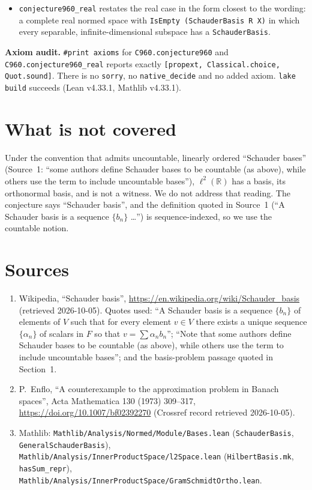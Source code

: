\documentclass[11pt]{article}
\theoremstyle{definition}
\begin{document}
\begin{itemize}
\begin{itemize}
  \texttt{FiniteDimensional K V} implies
  \texttt{Nonempty (UnconditionalSchauderBasis (Fin (Module.finrank K V)) K V)}, and
  \texttt{not (FiniteDimensional K V)} implies \texttt{Nonempty (SchauderBasis K V)};
  \item some \texttt{V : Submodule K X} is closed, separable and not finite-dimensional.
  \end{itemize}
\item \texttt{conjecture960\_real} restates the real case in the form closest to the wording: a
complete real normed space with \texttt{IsEmpty (SchauderBasis R X)} in which every separable,
infinite-dimensional subspace has a \texttt{SchauderBasis}.
\end{itemize}
\textbf{Axiom audit.} \texttt{\#print axioms} for \texttt{C960.conjecture960} and
\texttt{C960.conjecture960\_real} reports exactly \texttt{[propext, Classical.choice,
Quot.sound]}. There is no \texttt{sorry}, no \texttt{native\_decide} and no added axiom.
\texttt{lake build} succeeds (Lean v4.33.1, Mathlib v4.33.1).

\section{What is not covered}
Under the convention that admits uncountable, linearly ordered ``Schauder bases'' (Source~1:
``some authors define Schauder bases to be countable (as above), while others use the term to
include uncountable bases''), $\ell^2(\mathbb{R})$ has a basis, its orthonormal basis, and is not a
witness. We do not address that reading. The conjecture says ``Schauder basis'', and the definition
quoted in Source~1 (``A Schauder basis is a sequence $\{b_n\}$ \ldots'') is sequence-indexed, so we
use the countable notion.

\section*{Sources}
\begin{enumerate}
\item Wikipedia, ``Schauder basis'',
\url{https://en.wikipedia.org/wiki/Schauder_basis} (retrieved 2026-10-05). Quotes used: ``A
Schauder basis is a sequence $\{b_n\}$ of elements of $V$ such that for every element $v\in V$
there exists a unique sequence $\{\alpha_n\}$ of scalars in $F$ so that $v=\sum\alpha_nb_n$'';
``Note that some authors define Schauder bases to be countable (as above), while others use the
term to include uncountable bases''; and the basis-problem passage quoted in Section~1.
\item P.~Enflo, ``A counterexample to the approximation problem in Banach spaces'', Acta
Mathematica 130 (1973) 309--317, \url{https://doi.org/10.1007/bf02392270} (Crossref record
retrieved 2026-10-05).
\item Mathlib: \nolinkurl{Mathlib/Analysis/Normed/Module/Bases.lean} (\texttt{SchauderBasis},
\texttt{GeneralSchauderBasis}), \nolinkurl{Mathlib/Analysis/InnerProductSpace/l2Space.lean}
(\texttt{HilbertBasis.mk}, \texttt{hasSum\_repr}),
\nolinkurl{Mathlib/Analysis/InnerProductSpace/GramSchmidtOrtho.lean}.
\end{enumerate}
\end{document}
